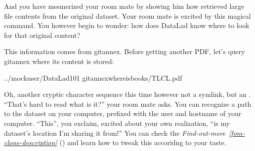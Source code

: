 \sphinxAtStartPar
And you have mesmerized your room mate by showing him how {\hyperref[\detokenize{glossary:term-git-annex}]{}}
retrieved large file contents from the original dataset.
Your room mate is excited by this magical command.
You however begin to wonder: how does DataLad know where to look for that original content?

\sphinxAtStartPar
This information comes from git\sphinxhyphen{}annex.
Before getting another PDF, let’s query git\sphinxhyphen{}annex where its content is stored:

\ignorespaces 
\def\sphinxLiteralBlockLabel{\label{\detokenize{basics/101-117-sharelocal2:index-1}}}
\begin{sphinxVerbatim}[commandchars=\\\{\}]
../mock\PYGZus{}user/DataLad\PYGZhy{}101
gitannexwhereisbooks/TLCL.pdf
\end{sphinxVerbatim}

\sphinxAtStartPar
Oh, another cryptic character sequence \sphinxhyphen{} this time however not a symlink, but an {\hyperref[\detokenize{glossary:term-annex-UUID}]{}}.
“That’s hard to read \textendash{} what is it?” your room mate asks.
You can recognize a path to the dataset on your computer, prefixed with the user and hostname of your computer.
“This”, you exclaim, excited about your own realization, “is my dataset’s location I’m sharing it from!” You can check the \textit{Find-out-more}~{\findoutmoreiconinline}\textit{\ref{fom-clone-description}} {\hyperref[\detokenize{basics/101-117-sharelocal2:fom-clone-description}]{}} () and learn how to tweak this accoridng to your taste.

